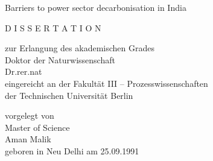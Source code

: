 \documentclass[a4paper,twoside,12pt,openright]{book}
\begin{document}
		\vspace*{\fill}
		\begin{center}
		\noindent \Huge%
		Barriers to power sector decarbonisation in India
	
		\vspace*{\fill}
		\vspace*{\fill}
		\vspace*{\fill}
		\vspace*{\fill}
	\end{center}
		\begin{center}
		\Large
		D I S S E R T A T I O N\\
			\end{center}
		\begin{center}
		\vspace*{\fill}
		zur Erlangung des akademischen Grades\\
		Doktor der Naturwissenschaft\\
		Dr.rer.nat\\[1ex]
		\vspace*{\fill}
		eingereicht an der Fakult\"at III -- Prozesswissenschaften\\
		der Technischen Universit\"at Berlin\\
		\vspace*{\fill}
		\end{center}
		\begin{center}
		vorgelegt von\\
		Master of Science\\
		Aman Malik\\
		geboren in Neu Delhi
		am 25.09.1991
		\end{center}
		\vspace*{\fill}

%
%	
%		
		\vspace*{\fill}
\vspace*{\fill}
\end{document}
